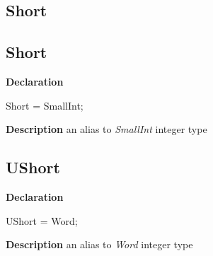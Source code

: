 \documentclass{report}
\newif\ifpdf
\begin{document}
\subsection*{\large{\textbf{Short}}\normalsize\hspace{1ex}\hrulefill}
\else
\subsection*{Short}
\fi
\label{NewPascal.Base-Short}
\begin{list}{}{
\setlength{\itemindent}{0cm}
\setlength{\listparindent}{0cm}
\setlength{\leftmargin}{\evensidemargin}
\addtolength{\leftmargin}{\tmplength}
\settowidth{\labelsep}{X}
\addtolength{\leftmargin}{\labelsep}
\setlength{\labelwidth}{\tmplength}
}
\item[\textbf{Declaration}\hfill]
\ifpdf
\begin{flushleft}
\fi
\begin{ttfamily}
Short = SmallInt;\end{ttfamily}

\ifpdf
\end{flushleft}
\fi

\par
\item[\textbf{Description}]
an alias to \textit{SmallInt} integer type

\end{list}
\ifpdf
\subsection*{\large{\textbf{UShort}}\normalsize\hspace{1ex}\hrulefill}
\else
\subsection*{UShort}
\fi
\label{NewPascal.Base-UShort}
\begin{list}{}{
\setlength{\itemindent}{0cm}
\setlength{\listparindent}{0cm}
\setlength{\leftmargin}{\evensidemargin}
\addtolength{\leftmargin}{\tmplength}
\settowidth{\labelsep}{X}
\addtolength{\leftmargin}{\labelsep}
\setlength{\labelwidth}{\tmplength}
}
\item[\textbf{Declaration}\hfill]
\ifpdf
\begin{flushleft}
\fi
\begin{ttfamily}
UShort = Word;\end{ttfamily}

\ifpdf
\end{flushleft}
\fi

\par
\item[\textbf{Description}]
an alias to \textit{Word} integer type

\end{list}
\ifpdf
\end{document}
